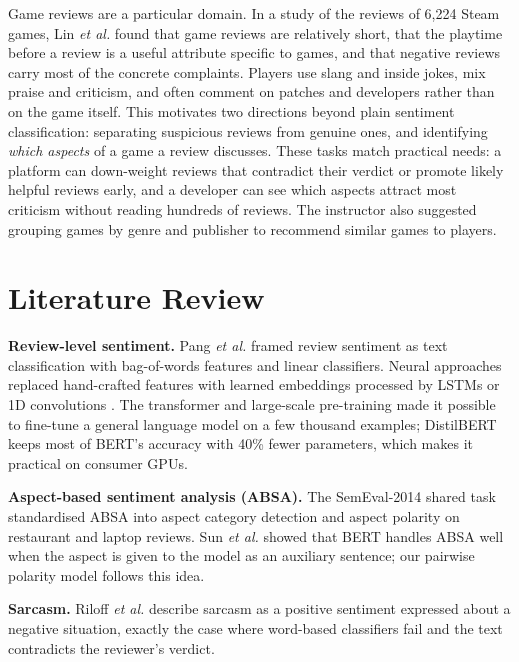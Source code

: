 Game reviews are a particular domain. In a study of the reviews of 6,224 Steam games, Lin \textit{et al.} \cite{Lin2019Steam} found that game reviews are relatively short, that the playtime before a review is a useful attribute specific to games, and that negative reviews carry most of the concrete complaints. Players use slang and inside jokes, mix praise and criticism, and often comment on patches and developers rather than on the game itself. This motivates two directions beyond plain sentiment classification: separating suspicious reviews from genuine ones, and identifying \textit{which aspects} of a game a review discusses. These tasks match practical needs: a platform can down-weight reviews that contradict their verdict or promote likely helpful reviews early, and a developer can see which aspects attract most criticism without reading hundreds of reviews. The instructor also suggested grouping games by genre and publisher to recommend similar games to players.

\section{Literature Review}

\textbf{Review-level sentiment.} Pang \textit{et al.} \cite{Pang2002} framed review sentiment as text classification with bag-of-words features and linear classifiers. Neural approaches replaced hand-crafted features with learned embeddings processed by LSTMs \cite{Hochreiter1997} or 1D convolutions \cite{Kim2014}. The transformer \cite{Vaswani2017} and large-scale pre-training \cite{Devlin2019} made it possible to fine-tune a general language model on a few thousand examples; DistilBERT \cite{Sanh2019} keeps most of BERT's accuracy with 40\% fewer parameters, which makes it practical on consumer GPUs.

\textbf{Aspect-based sentiment analysis (ABSA).} The SemEval-2014 shared task \cite{Pontiki2014} standardised ABSA into aspect category detection and aspect polarity on restaurant and laptop reviews. Sun \textit{et al.} \cite{SunABSA2019} showed that BERT handles ABSA well when the aspect is given to the model as an auxiliary sentence; our pairwise polarity model follows this idea.

\textbf{Sarcasm.} Riloff \textit{et al.} \cite{Riloff2013} describe sarcasm as a positive sentiment expressed about a negative situation, exactly the case where word-based classifiers fail and the text contradicts the reviewer's verdict.

